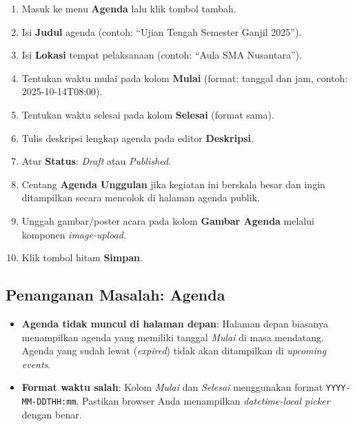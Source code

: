 \begin{enumerate}
  \item Masuk ke menu \textbf{Agenda} lalu klik tombol tambah.
  \item Isi \textbf{Judul} agenda (contoh: ``Ujian Tengah Semester Ganjil 2025'').
  \item Isi \textbf{Lokasi} tempat pelaksanaan (contoh: ``Aula SMA Nusantara'').
  \item Tentukan waktu mulai pada kolom \textbf{Mulai} (format: tanggal dan jam, contoh: 2025-10-14T08:00).
  \item Tentukan waktu selesai pada kolom \textbf{Selesai} (format sama).
  \item Tulis deskripsi lengkap agenda pada editor \textbf{Deskripsi}.
  \item Atur \textbf{Status}: \textit{Draft} atau \textit{Published}.
  \item Centang \textbf{Agenda Unggulan} jika kegiatan ini berskala besar dan
        ingin ditampilkan secara mencolok di halaman agenda publik.
  \item Unggah gambar/poster acara pada kolom \textbf{Gambar Agenda} melalui komponen
        \textit{image-upload}.
  \item Klik tombol hitam \textbf{Simpan}.
\end{enumerate}

\subsection{Penanganan Masalah: Agenda}

\begin{itemize}
  \item \textbf{Agenda tidak muncul di halaman depan}: Halaman depan biasanya menampilkan
        agenda yang memiliki tanggal \textit{Mulai} di masa mendatang. Agenda yang sudah
        lewat (\textit{expired}) tidak akan ditampilkan di \textit{upcoming events}.
  \item \textbf{Format waktu salah}: Kolom \textit{Mulai} dan \textit{Selesai} menggunakan
        format \texttt{YYYY-MM-DDTHH:mm}. Pastikan browser Anda menampilkan
        \textit{datetime-local picker} dengan benar.
\end{itemize}
